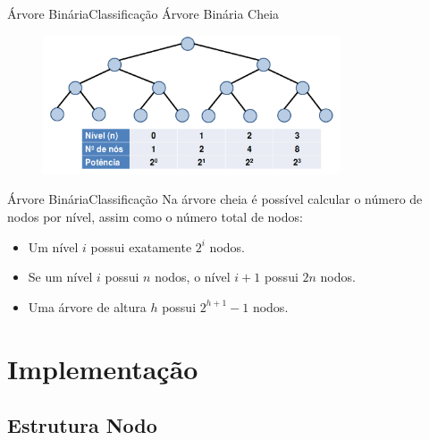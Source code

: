 \documentclass[aspectratio=169]{beamer}
\begin{document}

\begin{frame}{Árvore Binária}{Classificação}
Árvore Binária Cheia
 \begin{figure}[!h]
  \centering
   \includegraphics[width=250pt]{imagens/arvore_binaria_cheia.png}
  \label{fig_arvore_binaria_cheia}
\end{figure}
\end{frame}


\begin{frame}{Árvore Binária}{Classificação}
Na árvore cheia é possível calcular o número de nodos por nível, assim como o número total de nodos:
\begin{itemize}
 \item Um nível $i$ possui exatamente $2^i$ nodos.
 \item Se um nível $i$ possui $n$ nodos, o nível $i+1$ possui $2n$ nodos.
 \item Uma árvore de altura $h$ possui $2^{h+1} - 1$ nodos.
\end{itemize}
\end{frame}

\section{Implementação}

\subsection{Estrutura Nodo}
\end{document}
